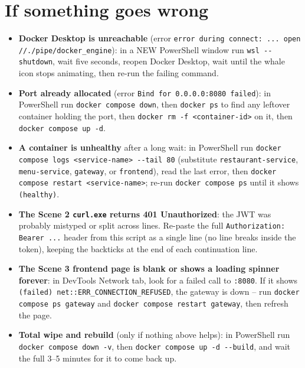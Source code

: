 \documentclass[11pt]{article}
\begin{document}
\section{If something goes wrong}

\begin{itemize}[leftmargin=*]
  \item[$\diamond$] \textbf{Docker Desktop is unreachable} (error \texttt{error during connect: ... open //./pipe/docker\_engine}): in a NEW PowerShell window run \texttt{wsl -{}-shutdown}, wait five seconds, reopen Docker Desktop, wait until the whale icon stops animating, then re-run the failing command.
  \item[$\diamond$] \textbf{Port already allocated} (error \texttt{Bind for 0.0.0.0:8080 failed}): in PowerShell run \texttt{docker compose down}, then \texttt{docker ps} to find any leftover container holding the port, then \texttt{docker rm -f <container-id>} on it, then \texttt{docker compose up -d}.
  \item[$\diamond$] \textbf{A container is unhealthy} after a long wait: in PowerShell run \texttt{docker compose logs <service-name> -{}-tail 80} (substitute \texttt{restaurant-service}, \texttt{menu-service}, \texttt{gateway}, or \texttt{frontend}), read the last error, then \texttt{docker compose restart <service-name>}; re-run \texttt{docker compose ps} until it shows \texttt{(healthy)}.
  \item[$\diamond$] \textbf{The Scene 2 \texttt{curl.exe} returns 401 Unauthorized}: the JWT was probably mistyped or split across lines. Re-paste the full \texttt{Authorization: Bearer ...} header from this script as a single line (no line breaks inside the token), keeping the backticks at the end of each continuation line.
  \item[$\diamond$] \textbf{The Scene 3 frontend page is blank or shows a loading spinner forever}: in DevTools Network tab, look for a failed call to \texttt{:8080}. If it shows \texttt{(failed) net::ERR\_CONNECTION\_REFUSED}, the gateway is down -- run \texttt{docker compose ps gateway} and \texttt{docker compose restart gateway}, then refresh the page.
  \item[$\diamond$] \textbf{Total wipe and rebuild} (only if nothing above helps): in PowerShell run \texttt{docker compose down -v}, then \texttt{docker compose up -d -{}-build}, and wait the full 3--5 minutes for it to come back up.
\end{itemize}
\end{document}
